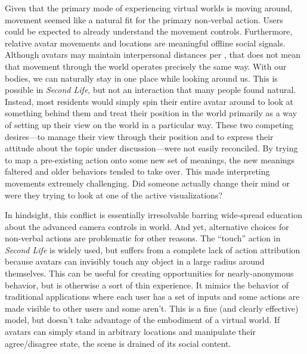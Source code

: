 Given that the primary mode of experiencing virtual worlds is moving around, movement seemed like a natural fit for the primary non-verbal action. Users could be expected to already understand the movement controls. Furthermore, relative avatar movements and locations are meaningful offline social signals.  Although avatars may maintain interpersonal distances per \citep{Yee:2007cl}, that does not mean that movement through the world operates precisely the same way. With our bodies, we can naturally stay in one place while looking around us. This is possible in \emph{Second Life}, but not an interaction that many people found natural. Instead, most residents would simply spin their entire avatar around to look at something behind them and treat their position in the world primarily as a way of setting up their view on the world in a particular way. These two competing desires---to manage their view through their position and to express their attitude about the topic under discussion---were not easily reconciled. By trying to map a pre-existing action onto some new set of meanings, the new meanings faltered and older behaviors tended to take over. This made interpreting movements extremely challenging. Did someone actually change their mind or were they trying to look at one of the active visualizations?

In hindsight, this conflict is essentially irresolvable barring wide-spread education about the advanced camera controls in world. And yet, alternative choices for non-verbal actions are problematic for other reasons. The ``touch'' action in \emph{Second Life} is widely used, but suffers from a complete lack of action attribution because avatars can invisibly touch any object in a large radius around themselves. This can be useful for creating opportunities for nearly-anonymous behavior, but is otherwise a sort of thin experience. It mimics the behavior of traditional applications where each user has a set of inputs and some actions are made visible to other users and some aren't. This is a fine (and clearly effective) model, but doesn't take advantage of the embodiment of a virtual world. If avatars can simply stand in arbitrary locations and manipulate their agree/disagree state, the scene is drained of its social content.

